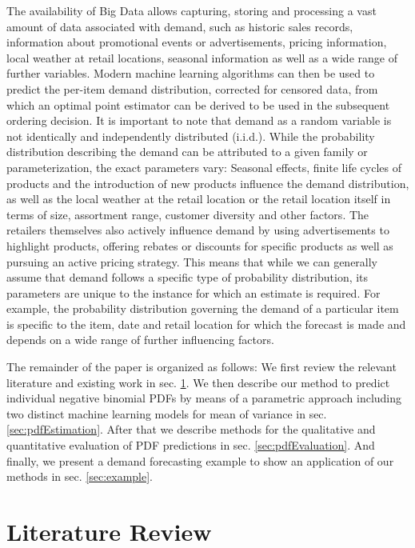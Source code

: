 \documentclass[BCOR=1mm, DIV=calc,10pt,
twoside=true,
twocolumn,
headings=normal]{scrartcl}
\begin{document}
The availability of Big Data allows capturing, storing and processing a vast amount of data associated with demand, such as historic sales records, information about promotional events or advertisements, pricing information, local weather at retail locations, seasonal information as well as a wide range of further variables. Modern machine learning algorithms can then be used to predict the per-item demand distribution, corrected for censored data, from which an optimal point estimator can be derived to be used in the subsequent ordering decision. It is important to note that demand as a random variable is not identically and independently distributed (i.i.d.). While the probability distribution describing the demand can be attributed to a given family or parameterization, the exact parameters vary: Seasonal effects, finite life cycles of products and the introduction of new products influence the demand distribution, as well as the local weather at the retail location or the retail location itself in terms of size, assortment range, customer diversity and other factors. The retailers themselves also actively influence demand by using advertisements to highlight products, offering rebates or discounts for specific products as well as pursuing an active pricing strategy. This means that while we can generally assume that demand follows a specific type of probability distribution, its parameters are unique to the  instance for which an estimate is required. For example, the probability distribution governing the demand of a particular item is specific to the item, date and retail location for which the forecast is made and depends on a wide range of further influencing factors.

The remainder of the paper is organized as follows: We first review the relevant literature and existing work in sec. \ref{sec:LitRev}. We then describe our method to predict individual negative binomial PDFs by means of a parametric approach including two distinct machine learning models for mean of variance in sec. \ref{sec:pdfEstimation}. After that we describe methods for the qualitative and quantitative evaluation of PDF predictions in sec. \ref{sec:pdfEvaluation}. And finally, we present a demand forecasting example to show an application of our methods in sec. \ref{sec:example}.


\section{Literature Review}
\label{sec:LitRev}
\end{document}
